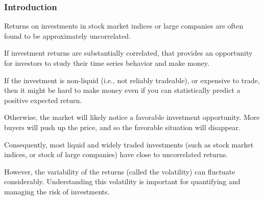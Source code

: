 \documentclass{beamer}\usepackage[]{graphicx}\usepackage[]{color}
\begin{document}
\begin{frame}[fragile]

\frametitle{Introduction}

\bi

\item Returns on investments in stock market indices or large companies are often found to be approximately uncorrelated. 

\item If investment returns are substantially correlated, that provides an opportunity for investors to study their time series behavior and make money. 

\item If the investment is non-liquid (i.e., not reliably tradeable), or expensive to trade, then it might be hard to make money even if you can statistically predict a positive expected return.

\item Otherwise, the market will likely notice a favorable investment opportunity. More buyers will push up the price, and so the favorable situation will disappear.

\item Consequently, most liquid and widely traded investments (such as stock market indices, or stock of large companies) have close to uncorrelated returns.

\item However, the variability of the returns (called the volatility) can fluctuate considerably. Understanding this volatility is important for quantifying and managing the risk of investments. 

\ei

\end{frame}
\end{document}
